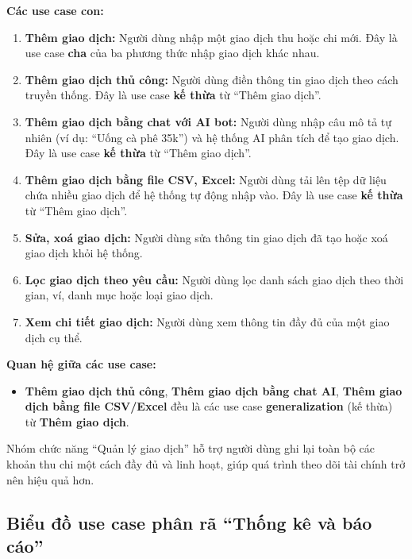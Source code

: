 \documentclass[../DoAn.tex]{subfiles}
\begin{document}
\textbf{Các use case con:}
\begin{enumerate}
    \item \textbf{Thêm giao dịch:}  
    Người dùng nhập một giao dịch thu hoặc chi mới.  
    Đây là use case \textbf{cha} của ba phương thức nhập giao dịch khác nhau.

    \item \textbf{Thêm giao dịch thủ công:}  
    Người dùng điền thông tin giao dịch theo cách truyền thống.  
    Đây là use case \textbf{kế thừa} từ “Thêm giao dịch”.

    \item \textbf{Thêm giao dịch bằng chat với AI bot:}  
    Người dùng nhập câu mô tả tự nhiên (ví dụ: “Uống cà phê 35k”) và hệ thống AI phân tích để tạo giao dịch.  
    Đây là use case \textbf{kế thừa} từ “Thêm giao dịch”.

    \item \textbf{Thêm giao dịch bằng file CSV, Excel:}  
    Người dùng tải lên tệp dữ liệu chứa nhiều giao dịch để hệ thống tự động nhập vào.  
    Đây là use case \textbf{kế thừa} từ “Thêm giao dịch”.

    \item \textbf{Sửa, xoá giao dịch:}  
    Người dùng sửa thông tin giao dịch đã tạo hoặc xoá giao dịch khỏi hệ thống.

    \item \textbf{Lọc giao dịch theo yêu cầu:}  
    Người dùng lọc danh sách giao dịch theo thời gian, ví, danh mục hoặc loại giao dịch.

    \item \textbf{Xem chi tiết giao dịch:}  
    Người dùng xem thông tin đầy đủ của một giao dịch cụ thể.
\end{enumerate}

\textbf{Quan hệ giữa các use case:}
\begin{itemize}
    \item \textbf{Thêm giao dịch thủ công}, 
    \textbf{Thêm giao dịch bằng chat AI}, 
    \textbf{Thêm giao dịch bằng file CSV/Excel}  
    đều là các use case \textbf{generalization} (kế thừa) từ \textbf{Thêm giao dịch}.
\end{itemize}

Nhóm chức năng ``Quản lý giao dịch'' hỗ trợ người dùng ghi lại toàn bộ các khoản thu chi một cách đầy đủ và linh hoạt, giúp quá trình theo dõi tài chính trở nên hiệu quả hơn.

\subsection{Biểu đồ use case phân rã ``Thống kê và báo cáo''}
\label{subsection:2.2.7}
\end{document}
